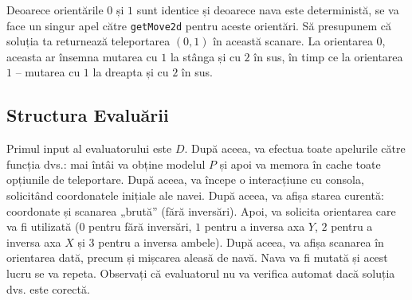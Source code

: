 \documentclass[12pt]{article}
\begin{document}
Deoarece orientările $0$ și $1$ sunt identice și deoarece nava este deterministă, se va face un singur apel către \verb|getMove2d| pentru aceste orientări. Să presupunem că soluția ta returnează teleportarea $(0, 1)$ în această scanare. La orientarea $0$, aceasta ar însemna mutarea cu $1$ la stânga și cu $2$ în sus, în timp ce la orientarea $1$ -- mutarea cu $1$ la dreapta și cu $2$ în sus.

\subsection{Structura Evaluării}


Primul input al evaluatorului este $D$. După aceea, va efectua toate apelurile către funcția dvs.: mai întâi va obține modelul $P$ și apoi va memora în cache toate opțiunile de teleportare. După aceea, va începe o interacțiune cu consola, solicitând coordonatele inițiale ale navei. După aceea, va afișa starea curentă: coordonate și scanarea „brută” (fără inversări). Apoi, va solicita orientarea care va fi utilizată ($0$ pentru fără inversări, $1$ pentru a inversa axa $Y$, $2$ pentru a inversa axa $X$ și $3$ pentru a inversa ambele). După aceea, va afișa scanarea în orientarea dată, precum și mișcarea aleasă de navă. Nava va fi mutată și acest lucru se va repeta. Observați că evaluatorul nu va verifica automat dacă soluția dvs. este corectă.
\end{document}
